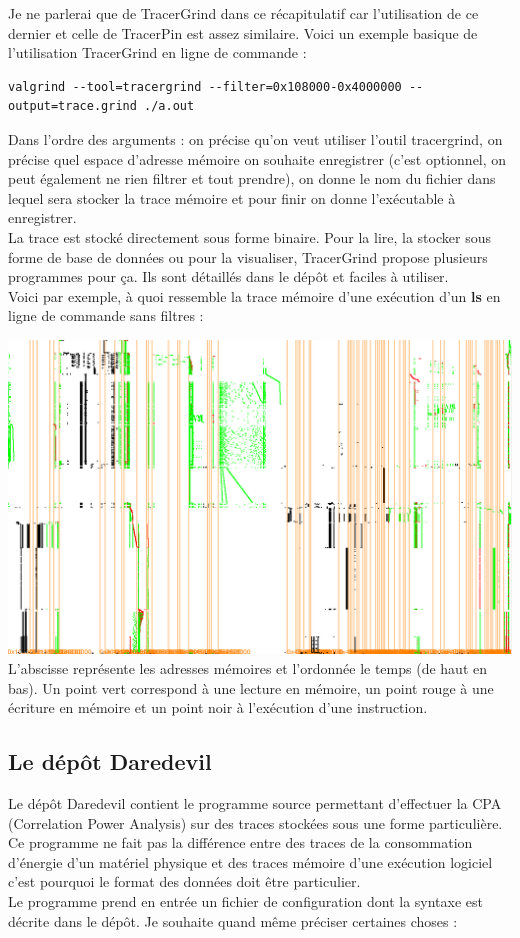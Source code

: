 \documentclass[10pt,a4paper]{article}
\begin{document}
Je ne parlerai que de TracerGrind dans ce récapitulatif car l'utilisation de ce dernier et celle de TracerPin est assez similaire. Voici un exemple basique de l'utilisation TracerGrind en ligne de commande :\\
\begin{lstlisting}
valgrind --tool=tracergrind --filter=0x108000-0x4000000 --output=trace.grind ./a.out
\end{lstlisting}
Dans l'ordre des arguments : on précise qu'on veut utiliser l'outil tracergrind, on précise quel espace d'adresse mémoire on souhaite enregistrer (c'est optionnel, on peut également ne rien filtrer et tout prendre), on donne le nom du fichier dans lequel sera stocker la trace mémoire et pour finir on donne l'exécutable à enregistrer.\\
La trace est stocké directement sous forme binaire. Pour la lire, la stocker sous forme de base de données ou pour la visualiser, TracerGrind propose plusieurs programmes pour ça. Ils sont détaillés dans le dépôt et faciles à utiliser.\\
Voici par exemple, à quoi ressemble la trace mémoire d'une exécution d'un \textbf{ls} en ligne de commande sans filtres :
\begin{center}
\includegraphics[scale=0.15]{Images/trace_ls.png}\\
L'abscisse représente les adresses mémoires et l'ordonnée le temps (de haut en bas). Un point vert correspond à une lecture en mémoire, un point rouge à une écriture en mémoire et un point noir à l'exécution d'une instruction.
\end{center}

\subsection{Le dépôt Daredevil}
Le dépôt Daredevil contient le programme source permettant d'effectuer la CPA (Correlation Power Analysis) sur des traces stockées sous une forme particulière. Ce programme ne fait pas la différence entre des traces de la consommation d'énergie d'un matériel physique et des traces mémoire d'une exécution logiciel c'est pourquoi le format des données doit être particulier.\\
Le programme prend en entrée un fichier de configuration dont la syntaxe est décrite dans le dépôt. Je souhaite quand même préciser certaines choses : 
\end{document}
